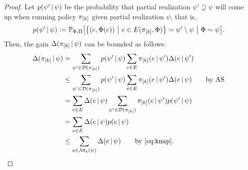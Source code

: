 \begin{proof}
  Let $p(\psi'\,\vert\,\psi)$ be the probability that partial realization $\psi' \supseteq \psi$ will come up when running policy $\pi_{[k]}$ given partial realization $\psi$, that is,
  {\small
  \begin{align*}
    p(\psi'\mmid\psi) \defeq \P[\Phi, \Pi]{\sdef{\left(e, \Phi(e)\right)}{e \in E(\pik, \Phi)} = \psi'\setminus\psi}[\Phi \sim \psi].
  \end{align*}
  }
  Then, the gain $\Delta(\pi_{[k]}\,\vert\,\psi)$ can be bounded as follows:
  \begin{align*}
    \D{\pik}{\psi} &= \sum_{\psi' \in \dom(\pik)}p(\psi'\mmid\psi)\sum_{e \in E}\pik(e\mmid\psi')\D{e}{\psi'}\\
    &\leq \sum_{\psi' \in \dom(\pik)}p(\psi'\mmid\psi)\sum_{e \in E}\pik(e\mmid\psi')\D{e}{\psi} \tag*{by AS}\\
    &= \sum_{e \in E}\D{e}{\psi} \sum_{\psi' \in \dom(\pik)}\pik(e\mmid\psi')p(\psi'\mmid\psi)\\
    &= \sum_{e \in E}\D{e}{\psi} p(e\mmid\psi)\\
    &\leq \sum_{e \in \mathcal{M}_k(\psi)} \D{e}{\psi} \tag*{by \eqref{eq:knap}}.
  \end{align*}
\end{proof}

